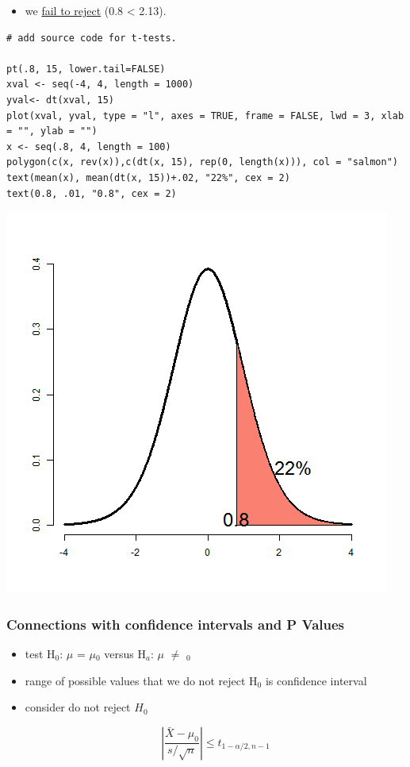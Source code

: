 \documentclass[11pt]{article}
\begin{document}
\begin{itemize}
\item we \underline{fail to reject} (0.8 < 2.13).
\end{itemize}


\begin{verbatim}
# add source code for t-tests. 

pt(.8, 15, lower.tail=FALSE)
xval <- seq(-4, 4, length = 1000)
yval<- dt(xval, 15)
plot(xval, yval, type = "l", axes = TRUE, frame = FALSE, lwd = 3, xlab = "", ylab = "")
x <- seq(.8, 4, length = 100)
polygon(c(x, rev(x)),c(dt(x, 15), rep(0, length(x))), col = "salmon")
text(mean(x), mean(dt(x, 15))+.02, "22%", cex = 2)
text(0.8, .01, "0.8", cex = 2)
\end{verbatim}

\includegraphics[width=.9\linewidth]{figure3.png}
\subsubsection{Connections with confidence intervals and P Values}
\label{sec-1-1-3}

\begin{itemize}
\item test H$_0$: $\mu$ = $\mu$$_0$ versus H$_a$: $\mu$ $\ne$ \m$_0$
\item range of possible values that we do not reject H$_0$ is confidence
  interval
\item consider do not reject $H_0$

 $$\left| \frac{\bar X - \mu_0}{s /\sqrt{n}} \right| \leq t_{1-\alpha/2, n-1}$$
\end{itemize}
\end{document}
